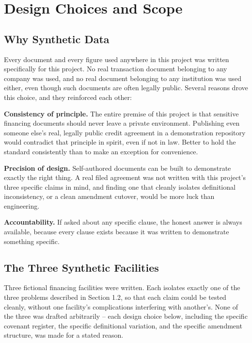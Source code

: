 \documentclass[11pt,a4paper]{article}
\begin{document}
\newpage
\section{Design Choices and Scope}

\subsection{Why Synthetic Data}

Every document and every figure used anywhere in this project was written specifically for this project. No real transaction document belonging to any company was used, and no real document belonging to any institution was used either, even though such documents are often legally public. Several reasons drove this choice, and they reinforced each other:

\textbf{Consistency of principle.} The entire premise of this project is that sensitive financing documents should never leave a private environment. Publishing even someone else's real, legally public credit agreement in a demonstration repository would contradict that principle in spirit, even if not in law. Better to hold the standard consistently than to make an exception for convenience.

\textbf{Precision of design.} Self-authored documents can be built to demonstrate exactly the right thing. A real filed agreement was not written with this project's three specific claims in mind, and finding one that cleanly isolates definitional inconsistency, or a clean amendment cutover, would be more luck than engineering.

\textbf{Accountability.} If asked about any specific clause, the honest answer is always available, because every clause exists because it was written to demonstrate something specific.

\subsection{The Three Synthetic Facilities}

Three fictional financing facilities were written. Each isolates exactly one of the three problems described in Section 1.2, so that each claim could be tested cleanly, without one facility's complications interfering with another's. None of the three was drafted arbitrarily -- each design choice below, including the specific covenant register, the specific definitional variation, and the specific amendment structure, was made for a stated reason.
\end{document}
